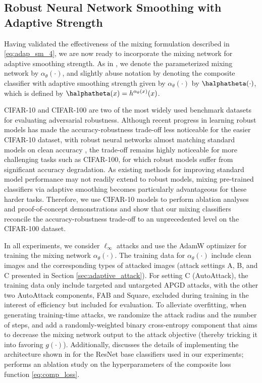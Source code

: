 \documentclass[11pt, letterpaper]{article}
\theoremstyle{plain}
\theoremstyle{definition}
\begin{document}
\subsection{Robust Neural Network Smoothing with Adaptive Strength} \label{sec:ada_exp}

Having validated the effectiveness of the mixing formulation described in \cref{eq:adap_sm_4}, we are now ready to incorporate the mixing network for adaptive smoothing strength. As in , we denote the parameterized mixing network by $\alpha_\theta (\cdot)$, and slightly abuse notation by denoting the composite classifier with adaptive smoothing strength given by $\alpha_\theta (\cdot)$ by $\halphatheta (\cdot)$, which is defined by $\halphatheta (x) = h^{\alpha_\theta(x)} (x)$.

CIFAR-10 and CIFAR-100 are two of the most widely used benchmark datasets for evaluating adversarial robustness. Although recent progress in learning robust models has made the accuracy-robustness trade-off less noticeable for the easier CIFAR-10 dataset, with robust neural networks almost matching standard models on clean accuracy \citep{Rebuffi21, Gowal20, Gowal21}, the trade-off remains highly noticeable for more challenging tasks such as CIFAR-100, for which robust models suffer from significant accuracy degradation. As existing methods for improving standard model performance may not readily extend to robust models, mixing pre-trained classifiers via adaptive smoothing becomes particularly advantageous for these harder tasks. Therefore, we use CIFAR-10 models to perform ablation analyses and proof-of-concept demonstrations and show that our mixing classifiers reconcile the accuracy-robustness trade-off to an unprecedented level on the CIFAR-100 dataset.

In all experiments, we consider $\ell_\infty$ attacks and use the AdamW optimizer \citep{Kingma15} for training the mixing network $\alpha_\theta (\cdot)$. The training data for $\alpha_\theta (\cdot)$ include clean images and the corresponding types of attacked images (attack settings A, B, and C presented in Section \ref{sec:adaptive_attack}). For setting C (AutoAttack), the training data only include targeted and untargeted APGD attacks, with the other two AutoAttack components, FAB and Square, excluded during training in the interest of efficiency but included for evaluation. To alleviate overfitting, when generating training-time attacks, we randomize the attack radius and the number of steps, and add a randomly-weighted binary cross-entropy component that aims to decrease the mixing network output to the attack objective (thereby tricking it into favoring $g (\cdot)$). Additionally,  discusses the details of implementing the architecture shown in  for the ResNet base classifiers used in our experiments;  performs an ablation study on the hyperparameters of the composite loss function \cref{eq:comp_loss}.
\end{document}
